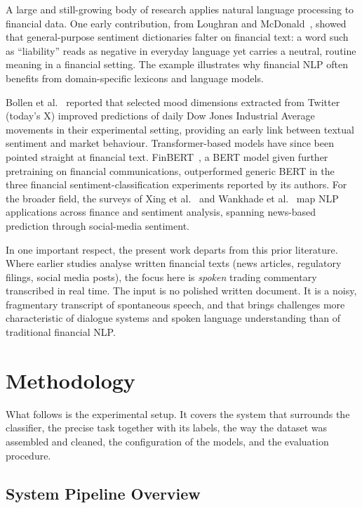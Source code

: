 A large and still-growing body of research applies natural language processing to financial data. One early contribution, from Loughran and McDonald~\cite{loughran2011liability}, showed that general-purpose sentiment dictionaries falter on financial text: a word such as ``liability'' reads as negative in everyday language yet carries a neutral, routine meaning in a financial setting. The example illustrates why financial NLP often benefits from domain-specific lexicons and language models.

Bollen et al.~\cite{bollen2011twitter} reported that selected mood dimensions extracted from Twitter (today's X) improved predictions of daily Dow Jones Industrial Average movements in their experimental setting, providing an early link between textual sentiment and market behaviour. Transformer-based models have since been pointed straight at financial text. FinBERT~\cite{yang2020finbert}, a BERT model given further pretraining on financial communications, outperformed generic BERT in the three financial sentiment-classification experiments reported by its authors. For the broader field, the surveys of Xing et al.~\cite{xing2018natural} and Wankhade et al.~\cite{wankhade2022sentiment} map NLP applications across finance and sentiment analysis, spanning news-based prediction through social-media sentiment.

In one important respect, the present work departs from this prior literature. Where earlier studies analyse written financial texts (news articles, regulatory filings, social media posts), the focus here is \emph{spoken} trading commentary transcribed in real time. The input is no polished written document. It is a noisy, fragmentary transcript of spontaneous speech, and that brings challenges more characteristic of dialogue systems and spoken language understanding than of traditional financial NLP.

\section{Methodology}
\label{sec:methodology}

What follows is the experimental setup. It covers the system that surrounds the classifier, the precise task together with its labels, the way the dataset was assembled and cleaned, the configuration of the models, and the evaluation procedure.

\subsection{System Pipeline Overview}
\label{sec:pipeline}

